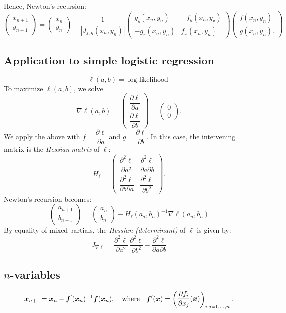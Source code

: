 \documentclass[12pt]{amsart}
\begin{document}
Hence, Newton's recursion:
\[
    \begin{pmatrix}
        x_{n+1}\\y_{n+1}
    \end{pmatrix}
    = \begin{pmatrix}
        x_n\\y_n
    \end{pmatrix}
    - \frac1{|J_{f,g}(x_n,y_n)|}
    \begin{pmatrix}
        g_y(x_n,y_n)&-f_y(x_n,y_n)\\-g_x(x_n,y_n)&f_x(x_n,y_n)
    \end{pmatrix}
    \begin{pmatrix}
        f(x_n,y_n)\\g(x_n,y_n).
    \end{pmatrix}
\]

\subsection{Application to simple logistic regression}
\[
    \ell(a,b) = \text{$\log$-likelihood}
\]
To maximize $\ell(a,b)$, we solve
\[
    \nabla \ell(a,b) = \begin{pmatrix}
        \dfrac{\partial \ell}{\partial a}\\[1.25em]\dfrac{\partial \ell}{\partial b}
    \end{pmatrix} = \begin{pmatrix}
        0\\0
    \end{pmatrix}.
\]
We apply the above with $f=\dfrac{\partial \ell}{\partial a}$ and $g=\dfrac{\partial \ell}{\partial b}$.
In this case, the intervening matrix is the \emph{Hessian matrix} of $\ell$:
\[
    H_\ell=\begin{pmatrix}
        \dfrac{\partial^2\ell}{\partial a^2}&\dfrac{\partial^2\ell}{\partial a\partial b}\\[1.5em]
        \dfrac{\partial^2\ell}{\partial b\partial a}&\dfrac{\partial^2\ell}{\partial b^2}
    \end{pmatrix}.
\]
Newton's recursion becomes:
\[
    \begin{pmatrix}
        a_{n+1}\\b_{n+1}
    \end{pmatrix}
    = \begin{pmatrix}
        a_{n}\\b_{n}
    \end{pmatrix} - H_\ell(a_n, b_n)^{-1}\nabla\ell(a_n, b_n)
\]
By equality of mixed partials, the \emph{Hessian (determinant)} of $\ell$ is given by:
\[
    J_{\nabla \ell} = \dfrac{\partial^2\ell}{\partial a^2}\,\dfrac{\partial^2\ell}{\partial b^2}
    - \dfrac{\partial^2\ell}{\partial a\partial b}
\]
\subsection{$n$-variables}
\[
    \boldsymbol{x}_{n+1} = \boldsymbol{x}_n - \boldsymbol{f}'(\boldsymbol{x}_n)^{-1}\boldsymbol{f}(\boldsymbol{x}_n),
    \quad\text{where}\quad 
    \boldsymbol{f}'(\boldsymbol{x}) = 
    \begin{pmatrix}
        \dfrac{\partial f_i}{\partial x_j}(\boldsymbol{x})
    \end{pmatrix}_{i,j=1,\ldots,n}.
\]
\end{document}
